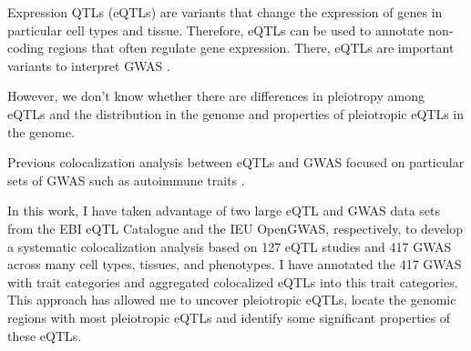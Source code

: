 Expression QTLs (eQTLs) are variants that change the expression of genes in particular cell types and tissue.
%
Therefore, eQTLs can be used to annotate non-coding regions that often regulate gene expression.
%
%
There, eQTLs are important variants to interpret GWAS .


However, we don't know whether there are differences in pleiotropy among eQTLs and the distribution in the genome and properties of  pleiotropic eQTLs in the genome.


Previous colocalization analysis between eQTLs and GWAS focused on particular sets of GWAS such as autoimmune traits \cite{2021.Li.Mu}.


In this work, I have taken advantage of two large eQTL and GWAS data sets from the EBI eQTL Catalogue and the IEU OpenGWAS, respectively,
to develop a systematic colocalization analysis based on 127 eQTL studies and 417 GWAS across many cell types, tissues, and phenotypes.
%
I have annotated the 417 GWAS with trait categories and aggregated colocalized eQTLs into this trait categories.
%
This approach has allowed me to uncover pleiotropic eQTLs, locate the genomic regions with most pleiotropic eQTLs
and identify some significant properties of these eQTLs.
%

